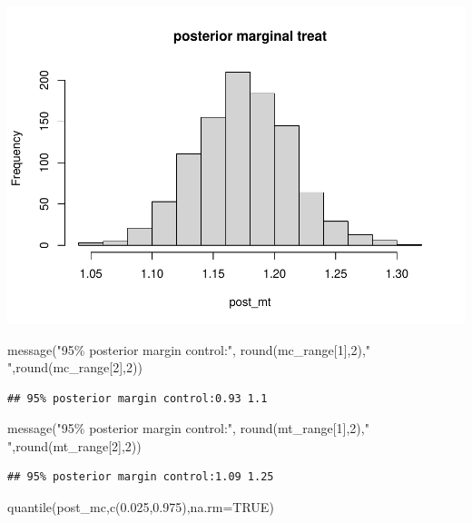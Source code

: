 \documentclass[
]{book}
\newenvironment{Shaded}{\begin{snugshade}}{\end{snugshade}}
\newcommand{\AttributeTok}[1]{\textcolor[rgb]{0.77,0.63,0.00}{#1}}
\newcommand{\ConstantTok}[1]{\textcolor[rgb]{0.00,0.00,0.00}{#1}}
\newcommand{\DecValTok}[1]{\textcolor[rgb]{0.00,0.00,0.81}{#1}}
\newcommand{\FloatTok}[1]{\textcolor[rgb]{0.00,0.00,0.81}{#1}}
\newcommand{\FunctionTok}[1]{\textcolor[rgb]{0.00,0.00,0.00}{#1}}
\newcommand{\NormalTok}[1]{#1}
\newcommand{\StringTok}[1]{\textcolor[rgb]{0.31,0.60,0.02}{#1}}
\theoremstyle{definition}
\theoremstyle{definition}
\theoremstyle{definition}
\theoremstyle{definition}
\theoremstyle{remark}
\begin{document}
\includegraphics{_main_files/figure-latex/unnamed-chunk-31-2.pdf}

\begin{Shaded}
\begin{Highlighting}[]
    \FunctionTok{message}\NormalTok{(}\StringTok{"95\% posterior margin control:"}\NormalTok{, }\FunctionTok{round}\NormalTok{(mc\_range[}\DecValTok{1}\NormalTok{],}\DecValTok{2}\NormalTok{),}\StringTok{" "}\NormalTok{,}\FunctionTok{round}\NormalTok{(mc\_range[}\DecValTok{2}\NormalTok{],}\DecValTok{2}\NormalTok{)) }
\end{Highlighting}
\end{Shaded}

\begin{verbatim}
## 95% posterior margin control:0.93 1.1
\end{verbatim}

\begin{Shaded}
\begin{Highlighting}[]
        \FunctionTok{message}\NormalTok{(}\StringTok{"95\% posterior margin control:"}\NormalTok{, }\FunctionTok{round}\NormalTok{(mt\_range[}\DecValTok{1}\NormalTok{],}\DecValTok{2}\NormalTok{),}\StringTok{" "}\NormalTok{,}\FunctionTok{round}\NormalTok{(mt\_range[}\DecValTok{2}\NormalTok{],}\DecValTok{2}\NormalTok{)) }
\end{Highlighting}
\end{Shaded}

\begin{verbatim}
## 95% posterior margin control:1.09 1.25
\end{verbatim}

\begin{Shaded}
\begin{Highlighting}[]
        \FunctionTok{quantile}\NormalTok{(post\_mc,}\FunctionTok{c}\NormalTok{(}\FloatTok{0.025}\NormalTok{,}\FloatTok{0.975}\NormalTok{),}\AttributeTok{na.rm=}\ConstantTok{TRUE}\NormalTok{)}
\end{Highlighting}
\end{Shaded}
\end{document}
